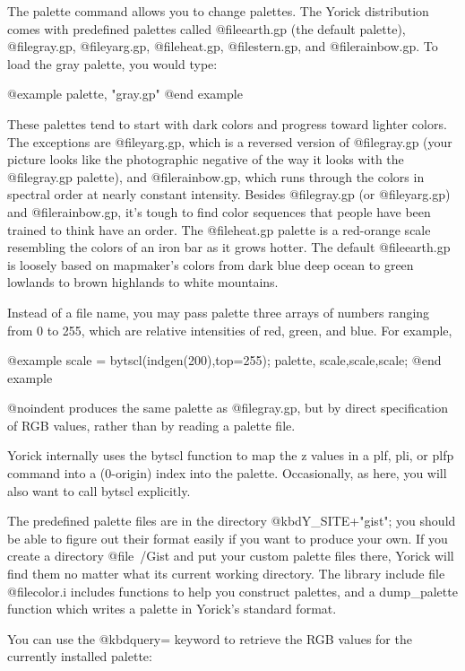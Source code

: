 The palette command allows you to change palettes.  The Yorick
distribution comes with predefined palettes called @file{earth.gp} (the
default palette), @file{gray.gp}, @file{yarg.gp}, @file{heat.gp},
@file{stern.gp}, and @file{rainbow.gp}.  To load the gray palette, you
would type:

@example
palette, "gray.gp"
@end example

These palettes tend to start with dark colors and progress toward
lighter colors.  The exceptions are @file{yarg.gp}, which is a reversed
version of @file{gray.gp} (your picture looks like the photographic
negative of the way it looks with the @file{gray.gp} palette), and
@file{rainbow.gp}, which runs through the colors in spectral order at
nearly constant intensity.  Besides @file{gray.gp} (or @file{yarg.gp})
and @file{rainbow.gp}, it's tough to find color sequences that people
have been trained to think have an order.  The @file{heat.gp} palette is
a red-orange scale resembling the colors of an iron bar as it grows
hotter.  The default @file{earth.gp} is loosely based on mapmaker's
colors from dark blue deep ocean to green lowlands to brown highlands to
white mountains.

Instead of a file name, you may pass palette three arrays of numbers
ranging from 0 to 255, which are relative intensities of red, green,
and blue.  For example,

@example
scale = bytscl(indgen(200),top=255);
palette, scale,scale,scale;
@end example

@noindent
produces the same palette as @file{gray.gp}, but by direct specification
of RGB values, rather than by reading a palette file.

Yorick internally uses the bytscl function to map the z values in a
plf, pli, or plfp command into a (0-origin) index into the palette.
Occasionally, as here, you will also want to call bytscl explicitly.

The predefined palette files are in the directory @kbd{Y_SITE+"gist"};
you should be able to figure out their format easily if you want to
produce your own.  If you create a directory @file{~/Gist} and put your
custom palette files there, Yorick will find them no matter what its
current working directory.  The library include file @file{color.i}
includes functions to help you construct palettes, and a dump_palette
function which writes a palette in Yorick's standard format.

You can use the @kbd{query=} keyword to retrieve the RGB values for the
currently installed palette:

